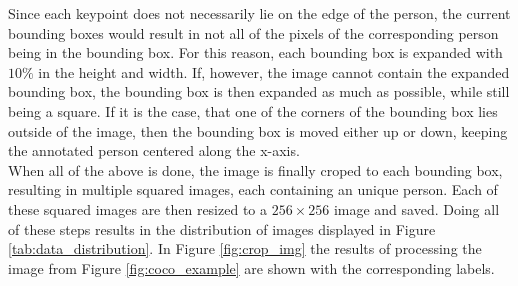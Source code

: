 \documentclass[main.tex]{subfiles}
\begin{document}
Since each keypoint does not necessarily lie on the edge of the person, the current bounding boxes would result in not all of the pixels of the corresponding person being in the bounding box. For this reason, each bounding box is expanded with $10\%$ in the height and width. If, however, the image cannot contain the expanded bounding box, the bounding box is then expanded as much as possible, while still being a square. If it is the case, that one of the corners of the bounding box lies outside of the image, then the bounding box is moved either up or down, keeping the annotated person centered along the x-axis. \\
When all of the above is done, the image is finally croped to each bounding box, resulting in multiple squared images, each containing an unique person. Each of these squared images are then resized to a $256 \times 256$ image and saved. Doing all of these steps results in the distribution of images displayed in Figure \ref{tab:data_distribution}. In Figure \ref{fig:crop_img} the results of processing the image from Figure \ref{fig:coco_example} are shown with the corresponding labels. 
\end{document}
